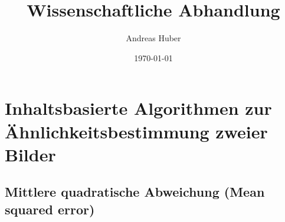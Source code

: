 \documentclass[a4paper,12pt]{article}
\title{Wissenschaftliche Abhandlung}
\author{Andreas Huber}
\date{\today}
\begin{document}

\newpage


\tableofcontents

\newpage


\newpage
{}



\section{Inhaltsbasierte Algorithmen zur Ähnlichkeitsbestimmung zweier Bilder}

\newpage
\subsection{Mittlere quadratische Abweichung (Mean squared error)}


\newpage


\newpage


\newpage


\newpage


\newpage


\newpage

\newpage


\newpage

\end{document}
